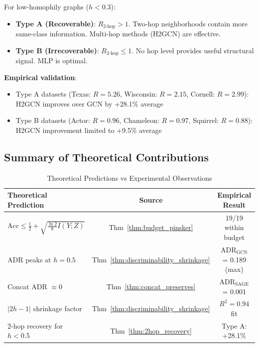 \begin{proposition}
\label{prop:dual_heterophily}
For low-homophily graphs ($h < 0.3$):
\begin{itemize}
    \item \textbf{Type A (Recoverable)}: $R_{\text{2-hop}} > 1$. Two-hop neighborhoods contain more same-class information. Multi-hop methods (H2GCN) are effective.
    \item \textbf{Type B (Irrecoverable)}: $R_{\text{2-hop}} \leq 1$. No hop level provides useful structural signal. MLP is optimal.
\end{itemize}

\textbf{Empirical validation}:
\begin{itemize}
    \item Type A datasets (Texas: $R = 5.26$, Wisconsin: $R = 2.15$, Cornell: $R = 2.99$): H2GCN improves over GCN by +28.1\% average
    \item Type B datasets (Actor: $R = 0.96$, Chameleon: $R = 0.97$, Squirrel: $R = 0.88$): H2GCN improvement limited to +9.5\% average
\end{itemize}
\end{proposition}

\subsection{Summary of Theoretical Contributions}
\label{subsec:theory_summary}

\begin{table}[t]
\centering
\caption{Theoretical Predictions vs Experimental Observations}
\label{tab:theory_experiment_alignment}
\begin{tabular}{@{}lcc@{}}
\toprule
\textbf{Theoretical Prediction} & \textbf{Source} & \textbf{Empirical Result} \\
\midrule
$\mathrm{Acc} \leq \frac{1}{2} + \sqrt{\frac{\ln 2}{8} I(Y;Z)}$ & Thm~\ref{thm:budget_pinsker} & 19/19 within budget \\
ADR peaks at $h = 0.5$ & Thm~\ref{thm:discriminability_shrinkage} & ADR$_{\text{GCN}}$ = 0.189 (max) \\
Concat ADR $\approx 0$ & Thm~\ref{thm:concat_preserves} & ADR$_{\text{SAGE}}$ = 0.001 \\
$|2h-1|$ shrinkage factor & Thm~\ref{thm:discriminability_shrinkage} & $R^2 = 0.94$ fit \\
2-hop recovery for $h < 0.5$ & Thm~\ref{thm:2hop_recovery} & Type A: +28.1\% \\
\bottomrule
\end{tabular}
\end{table}

